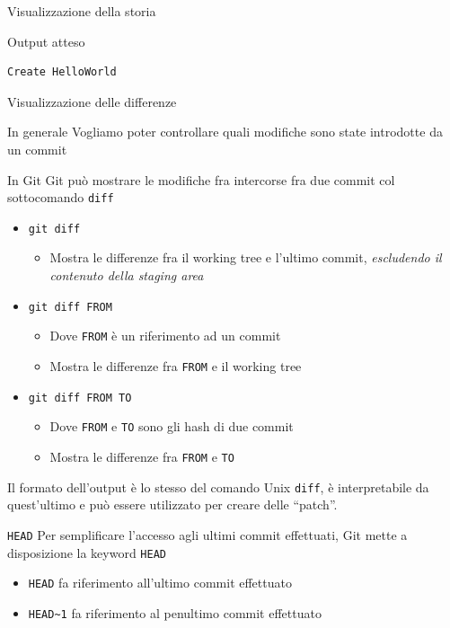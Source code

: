\documentclass[presentation]{beamer}
\begin{document}
\begin{frame}{Visualizzazione della storia}
\begin{block}{Output atteso}
\begin{Verbatim}[fontsize=\tiny]
      Create HelloWorld
		\end{Verbatim}
	\end{block}
\end{frame}

\begin{frame}{Visualizzazione delle differenze}
	\begin{block}{In generale}
		Vogliamo poter controllare quali modifiche sono state introdotte da un commit
	\end{block}
	\begin{block}{In Git}
		Git può mostrare le modifiche fra intercorse fra due commit col sottocomando \texttt{diff}
		\begin{itemize}
			\item \texttt{git diff}
			\begin{itemize}
				\item Mostra le differenze fra il working tree e l'ultimo commit, \textit{escludendo il contenuto della staging area}
			\end{itemize}
			\item \texttt{git diff FROM}
			\begin{itemize}
				\item Dove \texttt{FROM} è un riferimento ad un commit
				\item Mostra le differenze fra \texttt{FROM} e il working tree
			\end{itemize}
			\item \texttt{git diff FROM TO}
			\begin{itemize}
				\item Dove \texttt{FROM} e \texttt{TO} sono gli hash di due commit
				\item Mostra le differenze fra \texttt{FROM} e \texttt{TO}
			\end{itemize}
		\end{itemize}
		Il formato dell'output è lo stesso del comando Unix \texttt{diff}, è interpretabile da quest'ultimo e può essere utilizzato per creare delle ``patch''.
	\end{block}
	\begin{block}{\texttt{HEAD}}
		Per semplificare l'accesso agli ultimi commit effettuati, Git mette a disposizione la keyword \texttt{HEAD}
		\begin{itemize}
			\item \texttt{HEAD} fa riferimento all'ultimo commit effettuato
			\item \texttt{HEAD\textasciitilde{}1} fa riferimento al penultimo commit effettuato

\end{itemize}
\end{block}
\end{frame}
\end{document}
